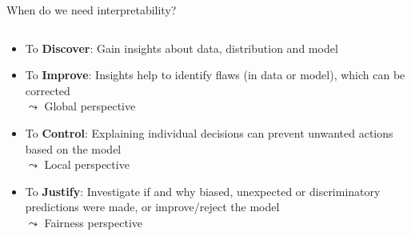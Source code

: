 \documentclass[11pt,compress,t,notes=noshow, aspectratio=169, xcolor=table]{beamer}
\begin{document}
\begin{frame}{When do we need interpretability?}
\begin{columns}[T]
\begin{column}{0.55\textwidth}
\begin{itemize}
  \item To \textbf{Discover}: Gain insights about data, distribution and model
  \pause 
  \item To \textbf{Improve}: Insights help to identify flaws (in data or model), which can be corrected\\
  $\leadsto$ Global perspective
  \pause
  \item To \textbf{Control}: Explaining individual decisions can prevent unwanted actions based on the model\\
  $\leadsto$ Local perspective
  \pause 
  \item To \textbf{Justify}: Investigate if and why biased, unexpected or discriminatory predictions were made, or improve/reject the model\\
  $\leadsto$ Fairness perspective


\end{itemize}
\end{column}
\end{columns}
\end{frame}
\end{document}
